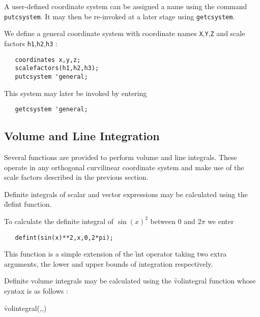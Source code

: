 A user-defined coordinate system can be assigned a name using the
command \texttt{putcsystem}. It may then be re-invoked at a later stage using
\texttt{getcsystem}.

\example{}

We define a general coordinate system with coordinate names \texttt{X},\texttt{Y},\texttt{Z}
and scale factors \texttt{h1},\texttt{h2},\texttt{h3} :
\begin{verbatim}
   coordinates x,y,z;
   scalefactors(h1,h2,h3);
   putcsystem 'general;
\end{verbatim}
This system may later be invoked by entering
\begin{verbatim}
   getcsystem 'general;
\end{verbatim}

\subsection{Volume and Line Integration}

Several functions are provided to perform volume and line integrals.
These operate in any orthogonal curvilinear coordinate system and
make use of the scale factors described in the previous section.


Definite integrals of scalar and vector expressions may be calculated
using the \f{defint} function.

\example{}

 
\hypertarget{operator:DEFINT}{}
\noindent To calculate the definite integral of $\sin(x)^2$ between 0 and
2$\pi$ we enter
\begin{verbatim}
   defint(sin(x)**2,x,0,2*pi);
\end{verbatim}
This function is a simple extension of the \f{int} operator taking
two extra arguments, the lower and upper bounds of integration
respectively.

 
\hypertarget{operator:VOLINTEGRAL}{}
Definite volume integrals may be calculated using the \f{volintegral}
function whose syntax is as follows :
\begin{syntax}
  \f{volintegral}(,,)
\end{syntax}

\example{}

